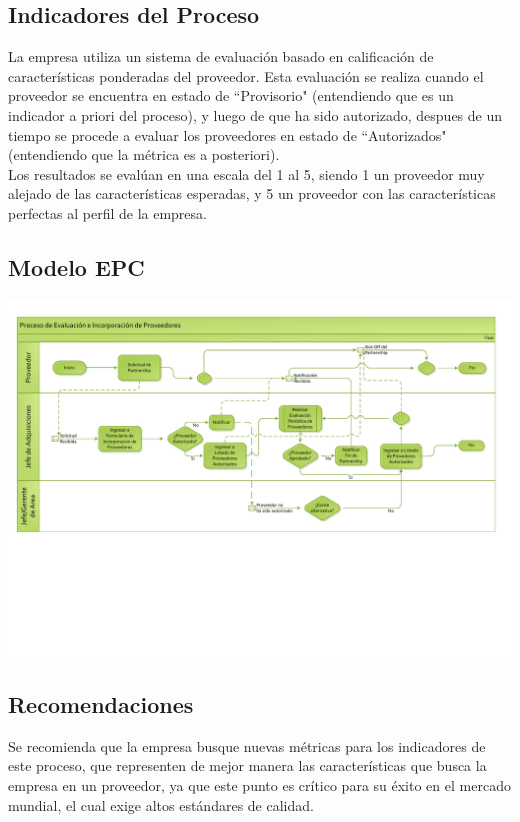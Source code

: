 \documentclass[12pt,letterpaper]{article}
\begin{document}
\subsection{Indicadores del Proceso}
La empresa utiliza un sistema de evaluación basado en calificación de características ponderadas del proveedor. Esta evaluación se realiza cuando el proveedor se encuentra en estado de ``Provisorio" (entendiendo que es un indicador a priori del proceso), y luego de que ha sido autorizado, despues de un tiempo se procede a evaluar los proveedores en estado de ``Autorizados" (entendiendo que la métrica es a posteriori).\\

Los resultados se evalúan en una escala del 1 al 5, siendo 1 un proveedor muy alejado de las características esperadas, y 5 un proveedor con las características perfectas al perfil de la empresa.

\subsection{Modelo EPC}
\includegraphics[angle=90,page=1,height=\textheight - 40px]{proveedores.pdf}

\subsection{Recomendaciones}
Se recomienda que la empresa busque nuevas métricas para los indicadores de este proceso, que representen de mejor manera las características que busca la empresa en un proveedor, ya que este punto es crítico para su éxito en el mercado mundial, el cual exige altos estándares de calidad.
\end{document}
